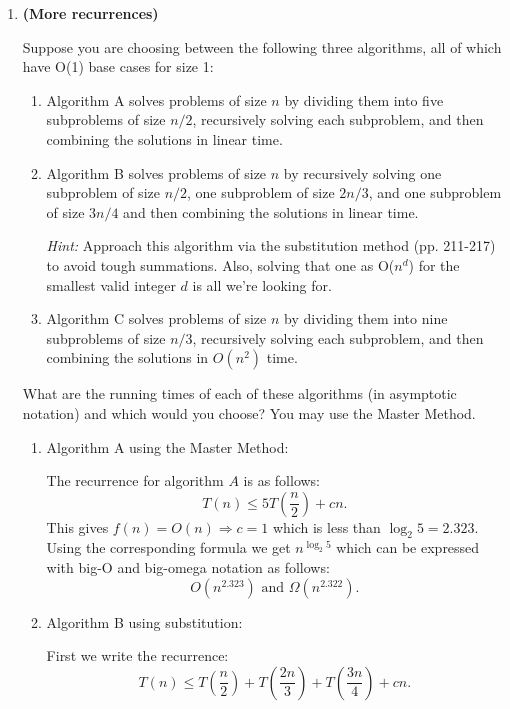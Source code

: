 \documentclass[letterpaper,11pt]{article}
\begin{document}
\begin{enumerate}
\begin{enumerate}
    \end{enumerate}



    \newpage
    \item \textbf{(More recurrences)}
    
    Suppose you are choosing between the following three algorithms, all of which have O(1) base cases for size 1:
\begin{enumerate}
        \item Algorithm A solves problems of size $n$ by dividing them into five subproblems of size $n/2$, recursively solving each subproblem, and then combining the solutions in linear time.
        \item Algorithm B solves problems of size $n$ by recursively solving one subproblem of size $n/2$, one subproblem of size $2n/3$, and one subproblem of size $3n/4$ and then combining the solutions in linear time. 
        
        \emph{Hint:}  Approach this algorithm via the substitution method (pp. 211-217) to avoid tough summations.  
        Also, solving that one as O($n^d$) for the smallest valid integer $d$ is all we're looking for.
        \item Algorithm C solves problems of size $n$ by dividing them into nine subproblems of size $n/3$, recursively solving each subproblem, and then combining the solutions in $O(n^{2})$ time.
\end{enumerate}
What are the running times of each of these algorithms (in asymptotic notation) and which would you choose?  You may use the
Master Method.

\begin{enumerate}
    \color{teal}
    \item Algorithm A using the Master Method:

        The recurrence for algorithm $A$ is as follows:
        \[
            T(n) \le 5T\left( \frac{n}{2} \right) + cn
        .\] 
        This gives $f\left( n \right) = O\left( n \right)  \Rightarrow c = 1$ 
        which is less than $\log_{2}{5} = 2.323$. Using the corresponding 
        formula we get $n^{\log_{2}{5}}$ which can be expressed with big-O
        and big-omega notation as follows: 
        \[
            O\left( n^{2.323} \right) \text{ and } \Omega \left( n^{2.322} \right) 
        .\] 

    \item Algorithm B using substitution:

        First we write the recurrence: 
        \[
            T\left( n \right) \le  T\left( \frac{n}{2} \right) + T\left( \frac{2n}{3} \right) + T\left( \frac{3n}{4} \right) + cn
        .\] 


\end{enumerate}
\end{enumerate}
\end{document}
